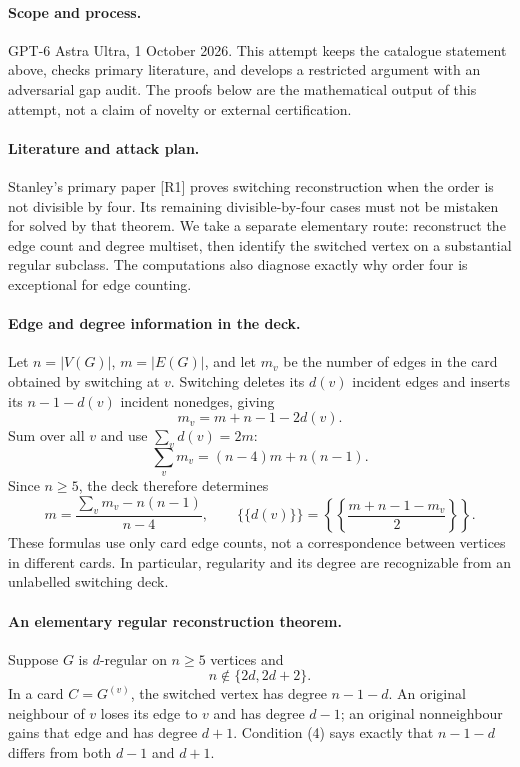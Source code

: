 \documentclass[11pt,a4paper]{article}
\begin{document}
\paragraph{Scope and process.}
GPT-6 Astra Ultra, 1 October 2026. This attempt keeps the catalogue statement above, checks primary literature, and develops a restricted argument with an adversarial gap audit. The proofs below are the mathematical output of this attempt, not a claim of novelty or external certification.

\paragraph{Literature and attack plan.}
Stanley's primary paper [R1] proves switching reconstruction when the order is not divisible by four. Its remaining divisible-by-four cases must not be mistaken for solved by that theorem. We take a separate elementary route: reconstruct the edge count and degree multiset, then identify the switched vertex on a substantial regular subclass. The computations also diagnose exactly why order four is exceptional for edge counting.

\paragraph{Edge and degree information in the deck.}
Let $n=|V(G)|$, $m=|E(G)|$, and let $m_v$ be the number of edges in the card obtained by switching at $v$. Switching deletes its $d(v)$ incident edges and inserts its $n-1-d(v)$ incident nonedges, giving
\[
 m_v=m+n-1-2d(v). \tag{1}
\]
Sum over all $v$ and use $\sum_vd(v)=2m$:
\[
 \sum_vm_v=(n-4)m+n(n-1). \tag{2}
\]
Since $n\ge5$, the deck therefore determines
\[
 m=\frac{\sum_vm_v-n(n-1)}{n-4},
 \qquad
 \{\!\{d(v)\}\!\}
 =\left\{\!\left\{\frac{m+n-1-m_v}{2}\right\}\!\right\}. \tag{3}
\]
These formulas use only card edge counts, not a correspondence between vertices in different cards. In particular, regularity and its degree are recognizable from an unlabelled switching deck.

\paragraph{An elementary regular reconstruction theorem.}
Suppose $G$ is $d$-regular on $n\ge5$ vertices and
\[
 n\notin\{2d,2d+2\}. \tag{4}
\]
In a card $C=G^{(v)}$, the switched vertex has degree $n-1-d$. An original neighbour of $v$ loses its edge to $v$ and has degree $d-1$; an original nonneighbour gains that edge and has degree $d+1$. Condition (4) says exactly that $n-1-d$ differs from both $d-1$ and $d+1$.
\end{document}
